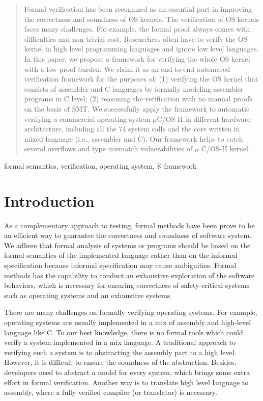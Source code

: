 \documentclass[conference]{IEEEtran}
\begin{document}
\begin{abstract}
Formal verification has been recognized as an essential
part in improving the correctness and soundness of OS
kernels. The verification of OS kernels faces many challenges.
For example, the formal proof always comes with difficulties
and non-trivial cost. Researchers often have to verify the OS
kernel in high level programming languages and ignore low level
languages. In this paper, we propose a framework for verifying
the whole OS kernel with a low proof burden. We claim it as an
end-to-end automated verification framework for the purposes
of: (1) verifying the OS kernel that consists of assembler and
C languages by formally modeling assembler programs in C
level; (2) reasoning the verification with no manual proofs on the
basis of SMT. We successfully apply the framework to automatic
verifying a commercial operating system $\mu$C/OS-II in different
hardware architecture, including all the 74 system calls and
the core written in mixed-language (i.e., assembler and C). Our
framework helps to catch several overflows and type mismatch
vulnerabilities of $\mu$ C/OS-II kernel.
\end{abstract}

\begin{IEEEkeywords}
formal semantics, verification, operating system, $\mathbb{K}$ framework
\end{IEEEkeywords}

\section{Introduction}
\par As a complementary approach to testing, formal methods have been prove to be an efficient way to  guarantee the correctness and soundness of software system. 
We adhere that formal analysis of systems or programs should be based on the formal semantics of the implemented language rather than on the informal specification because informal specification may cause ambiguities.
 Formal methods has the capability to conduct an exhaustive exploration of the software behaviors, which is necessary for ensuring correctness of safety-critical systems such as operating systems and an exhaustive systems.

 There are many challenges on formally verifying operating systems. For example, operating systems are usually implemented in a mix of assembly and high-level language like C. To our best knowledge, there is no formal tools which could verify a system implemented in a mix language. A traditional approach to verifying such a system is to abstracting the assembly part to a high level. However, it is difficult to ensure the soundness of the abstraction. Besides, developers need to abstract a model for every system, which brings some extra effort in formal verification. Another way is to translate high level language to assembly, where a fully verified compiler (or translator) is necessary.
 
\end{document}
